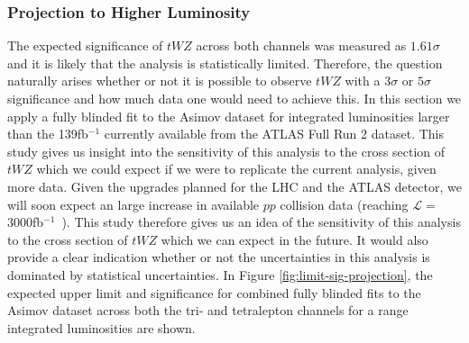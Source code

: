 \subsubsection{Projection to Higher Luminosity}

The expected significance of $tWZ$ across both channels was measured as $1.61\sigma$ and it is likely that the analysis is statistically limited. Therefore, the question naturally arises whether or not it is possible to observe $tWZ$ with a $3\sigma$ or $5\sigma$ significance and how much data one would need to achieve this. In this section we apply a fully blinded fit to the Asimov dataset for integrated luminosities larger than the 139fb$^{-1}$ currently available from the ATLAS Full Run 2 dataset. This study gives us insight into the sensitivity of this analysis to the cross section of $tWZ$ which we could expect if we were to replicate the current analysis, given more data. Given the upgrades planned for the LHC and the ATLAS detector, we will soon expect an large increase in available $pp$ collision data (reaching $\mathcal{L} =$ 3000fb$^{-1}$~\cite{HL-LHC-paper}). This study therefore gives us an idea of the sensitivity of this analysis to the cross section of $tWZ$ which we can expect in the future. It would also provide a clear indication whether or not the uncertainties in this analysis is dominated by statistical uncertainties. In Figure \ref{fig:limit-sig-projection}, the expected upper limit and significance for combined fully blinded fits to the Asimov dataset across both the tri- and tetralepton channels for a range integrated luminosities are shown.
